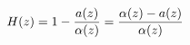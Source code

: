 \documentclass[preview]{standalone}
\begin{document}
\begin{align*}
\special{dvisvgm:raw <g id='unique000'>}H(z)=1-\frac{a(z)}{\alpha(z)}=\frac{\alpha(z)-a(z)}{\alpha(z)}\special{dvisvgm:raw </g>}
\end{align*}
\end{document}
